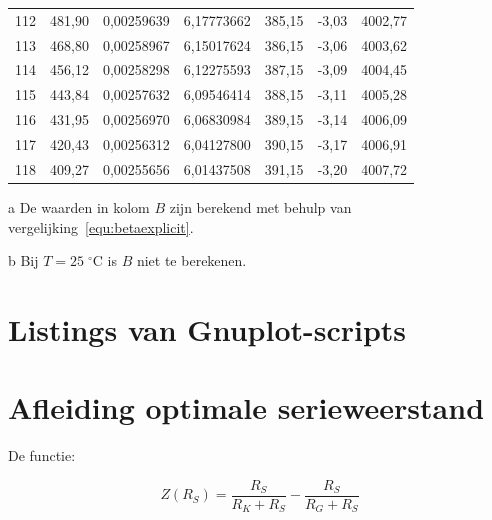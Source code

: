 \documentclass[12pt,a4paper,final,twoside,fleqn]{article}
\newcommand{\mathcelc}[1]{\mbox{$#1\;^\circ\text{C}$}}
\begin{document}
\begin{ThreePartTable}
\begin{longtable}{rrrrrrr}
112          & 481,90    & 0,00259639    & 6,17773662  & 385,15     & -3,03      & 4002,77 \\
113          & 468,80    & 0,00258967    & 6,15017624  & 386,15     & -3,06      & 4003,62 \\
114          & 456,12    & 0,00258298    & 6,12275593  & 387,15     & -3,09      & 4004,45 \\
115          & 443,84    & 0,00257632    & 6,09546414  & 388,15     & -3,11      & 4005,28 \\
116          & 431,95    & 0,00256970    & 6,06830984  & 389,15     & -3,14      & 4006,09 \\
117          & 420,43    & 0,00256312    & 6,04127800  & 390,15     & -3,17      & 4006,91 \\
118          & 409,27    & 0,00255656    & 6,01437508  & 391,15     & -3,20      & 4007,72 \\
\end{longtable}
\begin{tablenotes}
\footnotesize
\item [a] De waarden in kolom $B$ zijn berekend met behulp van vergelijking~\eqref{equ:betaexplicit}.
\item [b] Bij $T=\mathcelc{25}$ is $B$ niet te berekenen.
\end{tablenotes}
\end{ThreePartTable}

\clearpage
\section{Listings van Gnuplot-scripts}
\label{app:ntc_shh_straightline_beta}

\newpage
\label{app:ntc_shh_kelvin}

\newpage
\label{app:ntc_shh_straightline_adapt}



\clearpage
\section{Afleiding optimale serieweerstand}
\label{app:afleiding}
De functie:

\begin{equation}
Z(R_S) = \dfrac{R_S}{R_K+R_S}-\dfrac{R_S}{R_G+R_S}
\end{equation}
\end{document}
